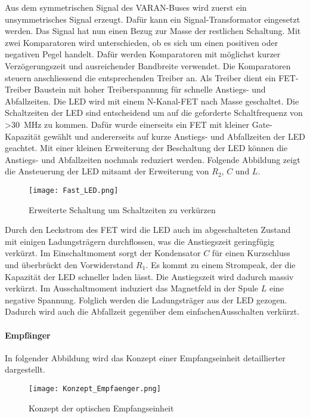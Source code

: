 Aus dem symmetrischen Signal des VARAN-Buses wird zuerst ein unsymmetrisches Signal erzeugt. Dafür kann ein Signal-Transformator eingesetzt werden. Das Signal hat nun einen Bezug zur Masse der restlichen Schaltung. Mit zwei Komparatoren wird unterschieden, ob es sich um einen positiven oder negativen Pegel handelt. Dafür werden Komparatoren mit möglichst kurzer Verzögerungszeit und ausreichender Bandbreite verwendet. Die Komparatoren steuern anschliessend die entsprechenden Treiber an. Als Treiber dient ein FET-Treiber Baustein mit hoher Treiberspannung für schnelle Anstiegs- und Abfallzeiten. Die LED wird mit einem N-Kanal-FET nach Masse geschaltet. Die Schaltzeiten der LED sind entscheidend um auf die geforderte Schaltfrequenz von \textgreater \SI{30}{MHz} zu kommen. Dafür wurde einerseits ein FET mit kleiner Gate-Kapazität gewählt und andererseits auf kurze Anstiegs- und Abfallzeiten der LED geachtet.
\newline
Mit einer kleinen Erweiterung der Beschaltung der LED können die Anstiegs- und Abfallzeiten nochmals reduziert werden. Folgende Abbildung zeigt die Ansteuerung der LED mitsamt der Erweiterung von $R_{2}$, $C$ und $L$.

 \begin{figure}[h]
 	\centering
 	\texttt{[image: Fast\_LED.png]}
 	\caption{Erweiterte Schaltung um Schaltzeiten zu verkürzen}\label{fig:Fast_LED}
 \end{figure}

Durch den Leckstrom des FET wird die LED auch im abgeschalteten Zustand mit einigen Ladungsträgern durchflossen, was die Anstiegszeit geringfügig verkürzt. Im Einschaltmoment sorgt der Kondensator $C$ für einen Kurzschluss und überbrückt den Vorwiderstand $R_{1}$. Es kommt zu einem Strompeak, der die Kapazität der LED schneller laden lässt. Die Anstiegszeit wird dadurch massiv verkürzt. Im Ausschaltmoment induziert das Magnetfeld in der Spule $L$ eine negative Spannung. Folglich werden die Ladungsträger aus der LED gezogen. Dadurch wird auch die Abfallzeit gegenüber dem \glqq einfachen\grqq Ausschalten verkürzt.

\paragraph{Empfänger}
In folgender Abbildung wird das Konzept einer Empfangseinheit detaillierter dargestellt.

\begin{figure}[h]
	\centering
	\texttt{[image: Konzept\_Empfaenger.png]}
	\caption{Konzept der optischen Empfangseinheit}\label{fig:Konzept_Empfaenger}
\end{figure}

